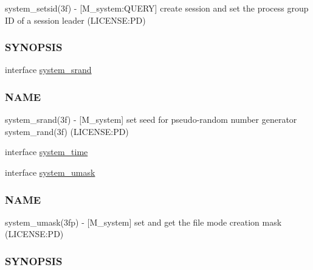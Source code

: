 \begin{DoxyCompactItemize}
\begin{DoxyCompactList}
system\+\_\+setsid(3f) -\/ \mbox{[}M\+\_\+system\+:Q\+U\+E\+RY\mbox{]} create session and set the process group ID of a session leader (L\+I\+C\+E\+N\+SE\+:PD) \subsubsection*{S\+Y\+N\+O\+P\+S\+IS}\end{DoxyCompactList}\item 
interface \mbox{\hyperlink{interfacem__system_1_1system__srand}{system\+\_\+srand}}
\begin{DoxyCompactList}\small\item\em \subsubsection*{N\+A\+ME}

system\+\_\+srand(3f) -\/ \mbox{[}M\+\_\+system\mbox{]} set seed for pseudo-\/random number generator system\+\_\+rand(3f) (L\+I\+C\+E\+N\+SE\+:PD) \end{DoxyCompactList}\item 
interface \mbox{\hyperlink{interfacem__system_1_1system__time}{system\+\_\+time}}
\item 
interface \mbox{\hyperlink{interfacem__system_1_1system__umask}{system\+\_\+umask}}
\begin{DoxyCompactList}\small\item\em \subsubsection*{N\+A\+ME}

system\+\_\+umask(3fp) -\/ \mbox{[}M\+\_\+system\mbox{]} set and get the file mode creation mask (L\+I\+C\+E\+N\+SE\+:PD) \subsubsection*{S\+Y\+N\+O\+P\+S\+IS}\end{DoxyCompactList}\end{DoxyCompactItemize}
